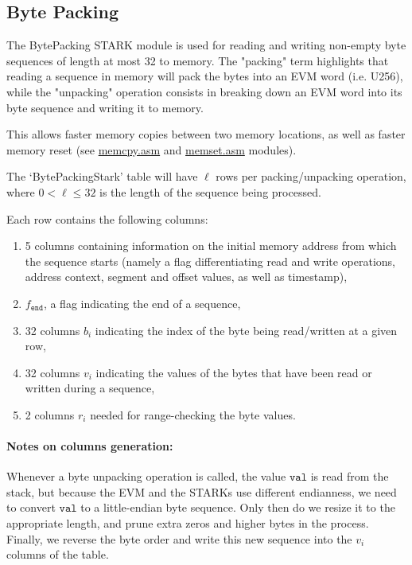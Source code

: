 \subsection{Byte Packing}
\label{byte-packing}

The BytePacking STARK module is used for reading and writing non-empty byte sequences of length at most 32 to memory.
The "packing" term highlights that reading a sequence in memory will pack the bytes into an EVM word (i.e. U256), while
the "unpacking" operation consists in breaking down an EVM word into its byte sequence and writing it to memory.

This allows faster memory copies between two memory locations, as well as faster memory reset
(see \href{https://github.com/0xPolygonZero/plonky2/blob/main/evm/src/cpu/kernel/asm/memory/memcpy.asm}{memcpy.asm} and 
\href{https://github.com/0xPolygonZero/plonky2/blob/main/evm/src/cpu/kernel/asm/memory/memset.asm}{memset.asm} modules).

The `BytePackingStark' table will have $\ell$ rows per packing/unpacking operation, where $0 < \ell \leq 32$ is the length of the sequence being processed.

Each row contains the following columns:
\begin{enumerate}
    \item 5 columns containing information on the initial memory address from which the sequence starts
    (namely a flag differentiating read and write operations, address context, segment and offset values, as well as timestamp),
    \item $f_{\texttt{end}}$, a flag indicating the end of a sequence,
    \item 32 columns $b_i$ indicating the index of the byte being read/written at a given row,
    \item 32 columns $v_i$ indicating the values of the bytes that have been read or written during a sequence,
    \item 2 columns $r_i$ needed for range-checking the byte values.
\end{enumerate}

\paragraph{Notes on columns generation:}
Whenever a byte unpacking operation is called, the value $\texttt{val}$ is read from the stack, but because the EVM and the STARKs use different endianness, we need to convert $\texttt{val}$ to a little-endian byte sequence. Only then do we resize it to the appropriate length, and prune extra zeros and higher bytes in the process. Finally, we reverse the byte order and write this new sequence into the $v_i$ columns of the table. 

